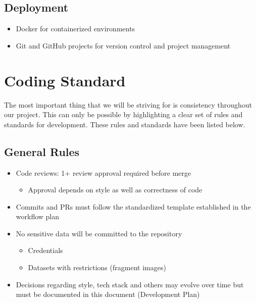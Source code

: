 \documentclass{article}
\begin{document}
\subsection*{Deployment}
\begin{itemize}
    \item Docker for containerized environments
    \item Git and GitHub projects for version control and project management
\end{itemize}

\section{Coding Standard}

\noindent The most important thing that we will be striving for is consistency throughout our project. This can only be possible by highlighting a clear set of rules and standards for development. These rules and standards have been listed below.

\subsection*{General Rules}
\begin{itemize}
    \item Code reviews: 1+ review approval required before merge
    \begin{itemize}
        \item Approval depends on style as well as correctness of code
    \end{itemize}
    \item Commits and PRs must follow the standardized template established in the workflow plan
    \item No sensitive data will be committed to the repository
    \begin{itemize}
        \item Credentials
        \item Datasets with restrictions (fragment images)
    \end{itemize}
    \item Decisions regarding style, tech stack and others may evolve over time but must be documented in this document (Development Plan)
\end{itemize}
\end{document}
